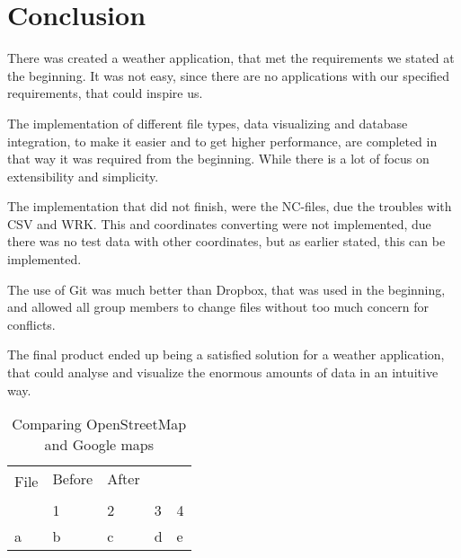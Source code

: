 \chapter{Conclusion}
There was created a weather application, that met the requirements we stated at the beginning.
It was not easy, since there are no applications with our specified requirements, that could inspire us.

The implementation of different file types, data visualizing and database integration, to make it easier and to get higher performance, are completed in that way it was required from the beginning. While there is a lot of focus on extensibility and simplicity.
 
The implementation that did not finish, were the NC-files, due the troubles with CSV and WRK. This and coordinates converting were not implemented, due there was no test data with other coordinates, but as earlier stated, this can be implemented.

The use of Git was much better than Dropbox, that was used in the beginning, and allowed all group members to change files without too much concern for conflicts.

The final product ended up being a satisfied solution for a weather application, that could analyse and visualize the enormous amounts of data in an intuitive way.

\begin{table}[htbp]
\centering
\begin{tabular}{| l | l | l | l | l |}
\hline
\multirow{2}{*}{File} & Before & After \\ & & \\ \hline
 & 1 & 2 & 3 & 4 \\ \hline
a & b & c & d & e
\hline
\end{tabular}
\caption{Comparing OpenStreetMap and Google maps}
\label{tab:osm_vs_google}
\end{table}